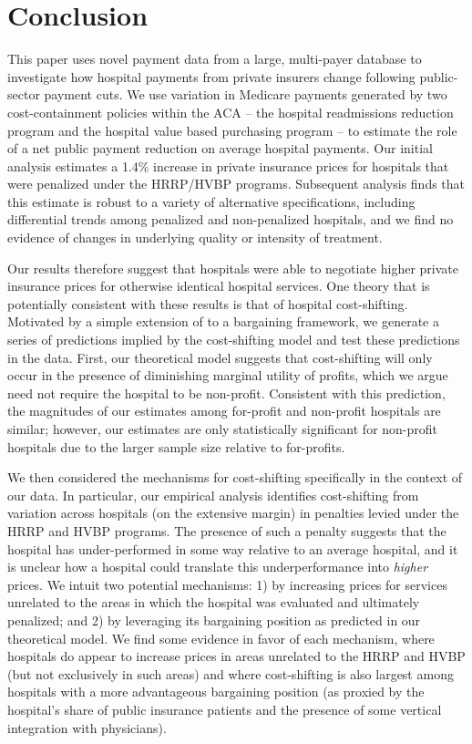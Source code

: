 \documentclass[12pt]{article}
\begin{document}
\section{Conclusion}
\label{sec:Conclusion}
This paper uses novel payment data from a large, multi-payer database to investigate how hospital payments from private insurers change following public-sector payment cuts. We use variation in Medicare payments generated by two cost-containment policies within the ACA -- the hospital readmissions reduction program and the hospital value based purchasing program -- to estimate the role of a net public payment reduction on average hospital payments. Our initial analysis estimates a 1.4\% increase in private insurance prices for hospitals that were penalized under the HRRP/HVBP programs. Subsequent analysis finds that this estimate is robust to a variety of alternative specifications, including differential trends among penalized and non-penalized hospitals, and we find no evidence of changes in underlying quality or intensity of treatment.

Our results therefore suggest that hospitals were able to negotiate higher private insurance prices for otherwise identical hospital services. One theory that is potentially consistent with these results is that of hospital cost-shifting. Motivated by a simple extension of \cite{dranove1988} to a bargaining framework, we generate a series of predictions implied by the cost-shifting model and test these predictions in the data. First, our theoretical model suggests that cost-shifting will only occur in the presence of diminishing marginal utility of profits, which we argue need not require the hospital to be non-profit. Consistent with this prediction, the magnitudes of our estimates among for-profit and non-profit hospitals are similar; however, our estimates are only statistically significant for non-profit hospitals due to the larger sample size relative to for-profits.

We then considered the mechanisms for cost-shifting specifically in the context of our data. In particular, our empirical analysis identifies cost-shifting from variation across hospitals (on the extensive margin) in penalties levied under the HRRP and HVBP programs. The presence of such a penalty suggests that the hospital has under-performed in some way relative to an average hospital, and it is unclear how a hospital could translate this underperformance into \textit{higher} prices. We intuit two potential mechanisms: 1) by increasing prices for services unrelated to the areas in which the hospital was evaluated and ultimately penalized; and 2) by leveraging its bargaining position as predicted in our theoretical model. We find some evidence in favor of each mechanism, where hospitals do appear to increase prices in areas unrelated to the HRRP and HVBP (but not exclusively in such areas) and where cost-shifting is also largest among hospitals with a more advantageous bargaining position (as proxied by the hospital's share of public insurance patients and the presence of some vertical integration with physicians).
\end{document}
